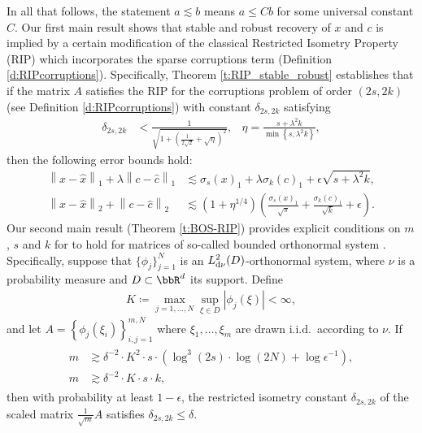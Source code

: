 In all that follows, the statement $a \lesssim b$ means $a \leq C b$ for some universal constant $C$. Our first main result shows that stable and robust recovery of $x$ and $c$ is implied by a certain modification of the classical Restricted Isometry Property (RIP) which incorporates the sparse corruptions term (Definition \ref{d:RIPcorruptions}).  Specifically, Theorem \ref{t:RIP_stable_robust} establishes that if the matrix $A$ satisfies the RIP for the corruptions problem of order $(2s,2k)$ (see Definition \ref{d:RIPcorruptions}) with constant $\delta_{2s,2k}$ satisfying
\begin{align}\label{eq:delta_intro}
\delta_{2s,2k} &< \frac{1}{\sqrt{1+\left ( \frac{1}{2\sqrt{2}} + \sqrt{\eta} \right)^2}}, & \eta = \frac{s + \lambda^2 k}{\min\left\{ s, \lambda^2 k \right\}},
\end{align}
then the following error bounds hold:
\begin{subequations}\label{eq:recovery-summary}
\begin{align}\label{eq:recovery-summary-l1}
  \left\| x - \hat{x} \right\|_1 + \lambda \left\| c - \hat{c} \right\|_1 &\lesssim \sigma_s(x)_1 + \lambda \sigma_k(c)_1 + \epsilon \sqrt{s + \lambda^2 k},\\\label{eq:recovery-summary-l2}
  \left\| x - \hat{x} \right\|_2 + \left\| c - \hat{c} \right\|_2 &\lesssim \left(1 + \eta^{1/4}\right) \left( \frac{\sigma_s(x)_1}{\sqrt{s}} + \frac{\sigma_k(c)_1}{\sqrt{k}} + \epsilon \right).
\end{align}
\end{subequations}
Our second main result (Theorem \ref{t:BOS-RIP}) provides explicit conditions on $m$, $s$ and $k$ for  to hold for matrices of so-called bounded orthonormal system \cite[Chpt.\ 12]{FoucartRauhutCSbook}.  Specifically, suppose that $\{ \phi_j \}^{N}_{j=1}$ is an $L^2_{\mathrm{d} \nu}(D)$-orthonormal system, where $\nu$ is a probability measure and $D \subset \bbR^d$ its support.  Define
\begin{align*}
  K \coloneqq \max_{j=1, \ldots, N} \sup_{\xi \in D} \left|\phi_j(\xi)\right| < \infty,
\end{align*}
and let $A = \left \{ \phi_j(\xi_i) \right \}^{m,N}_{i,j=1}$ where $\xi_1,\ldots,\xi_m$ are drawn i.i.d.\ according to $\nu$.  If 
\begin{align}\label{eq:m-bound}
\begin{aligned}
  m & \gtrsim \delta^{-2} \cdot K^2 \cdot s \cdot \left( \log^3(2s) \cdot \log(2 N) + \log \epsilon^{-1} \right),
  \\
    m & \gtrsim \delta^{-2} \cdot K \cdot s \cdot k,
  \end{aligned}
\end{align}
then with probability at least $1-\epsilon$, the restricted isometry constant $\delta_{2s,2k}$ of the scaled matrix $\frac{1}{\sqrt{m}} A$ satisfies $\delta_{2s,2k} \leq \delta$.

